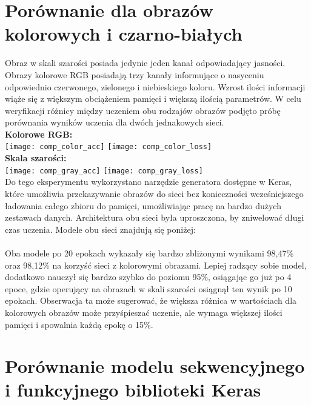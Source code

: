 \section{Porównanie dla obrazów kolorowych i czarno-białych}
Obraz w skali szarości posiada jedynie jeden kanał odpowiadający jasności. Obrazy kolorowe RGB
posiadają trzy kanały informujące o nasyceniu odpowiednio czerwonego, zielonego i niebieskiego koloru.
Wzrost ilości informacji wiąże się z większym obciążeniem pamięci i większą ilością parametrów.
W celu weryfikacji różnicy między uczeniem obu rodzajów obrazów podjęto próbę porównania wyników
uczenia dla dwóch jednakowych sieci.\\
\textbf{Kolorowe RGB:}\\
\texttt{[image: comp\_color\_acc]}
\texttt{[image: comp\_color\_loss]}\\
\textbf{Skala szarości:}\\
\texttt{[image: comp\_gray\_acc]}
\texttt{[image: comp\_gray\_loss]}\\
Do tego eksperymentu wykorzystano narzędzie generatora dostępne w Keras, które umożliwia
przekazywanie obrazów do sieci bez konieczności wcześniejszego ładowania całego zbioru
do pamięci, umożliwiając pracę na bardzo dużych zestawach danych. Architektura obu
sieci była uproszczona, by zniwelować długi czas uczenia. Modele obu sieci znajdują się poniżej:\\\\
Oba modele po 20 epokach wykazały się bardzo zbliżonymi wynikami 98,47\% oraz 98,12\%
na korzyść sieci z kolorowymi obrazami. Lepiej radzący sobie model, dodatkowo nauczył
się bardzo szybko do poziomu 95\%, osiągając go już po 4 epoce, gdzie operujący na
obrazach w skali szarości osiągnął ten wynik po 10 epokach. Obserwacja ta może sugerować,
że większa różnica w wartościach dla kolorowych obrazów może przyśpieszać uczenie, ale
wymaga większej ilości pamięci i spowalnia każdą epokę o 15\%.

\section{Porównanie modelu sekwencyjnego i funkcyjnego biblioteki Keras}
